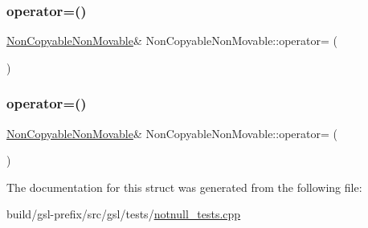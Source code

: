 \subsubsection{\texorpdfstring{operator=()}{operator=()}\hspace{0.1cm}{\footnotesize\ttfamily [1/2]}}
{\footnotesize\ttfamily \hyperlink{structNonCopyableNonMovable}{Non\+Copyable\+Non\+Movable}\& Non\+Copyable\+Non\+Movable\+::operator= (\begin{DoxyParamCaption}\item[{const \hyperlink{structNonCopyableNonMovable}{Non\+Copyable\+Non\+Movable} \&}]{ }\end{DoxyParamCaption})\hspace{0.3cm}{\ttfamily [delete]}}

\mbox{\label{structNonCopyableNonMovable_a2e1af14022b8a268721bed0e3f7391c4}} 
\subsubsection{\texorpdfstring{operator=()}{operator=()}\hspace{0.1cm}{\footnotesize\ttfamily [2/2]}}
{\footnotesize\ttfamily \hyperlink{structNonCopyableNonMovable}{Non\+Copyable\+Non\+Movable}\& Non\+Copyable\+Non\+Movable\+::operator= (\begin{DoxyParamCaption}\item[{\hyperlink{structNonCopyableNonMovable}{Non\+Copyable\+Non\+Movable} \&\&}]{ }\end{DoxyParamCaption})\hspace{0.3cm}{\ttfamily [delete]}}



The documentation for this struct was generated from the following file\+:\begin{DoxyCompactItemize}
\item 
build/gsl-\/prefix/src/gsl/tests/\hyperlink{notnull__tests_8cpp}{notnull\+\_\+tests.\+cpp}\end{DoxyCompactItemize}
